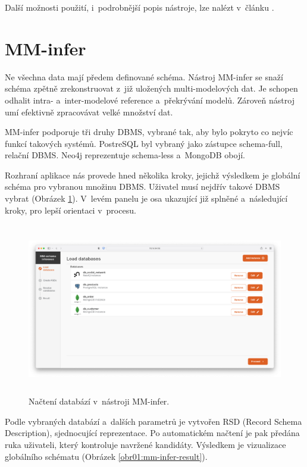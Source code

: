 Další možnosti použití, i~podrobnější popis nástroje, lze nalézt v~článku \cite{MM_cat}.


\section{MM-infer}

Ne všechna data mají předem definované schéma. Nástroj MM-infer se snaží schéma zpětně zrekonstruovat z~již uložených multi-modelových dat. Je schopen odhalit intra- a~inter-modelové reference a~překrývání modelů. Zároveň nástroj umí efektivně zpracovávat velké množství dat.

MM-infer podporuje tři druhy DBMS, vybrané tak, aby bylo pokryto co nejvíc funkcí takových systémů. PostreSQL byl vybraný jako zástupce schema-full, relační DBMS. Neo4j reprezentuje schema-less a~MongoDB obojí. 

Rozhraní aplikace nás provede hned několika kroky, jejichž výsledkem je globální schéma pro vybranou množinu DBMS. Uživatel musí nejdřív takové DBMS vybrat (Obrázek \ref{obr01:mm-infer-load-database}). V~levém panelu je osa ukazující již splněné a~následující kroky, pro lepší orientaci v~procesu.

\begin{figure}[htb]
  \centering
  \includegraphics[height=75mm]{../img/mm-infer-load-database}
  \caption{Načtení databází v~nástroji MM-infer.}
  \label{obr01:mm-infer-load-database}
\end{figure}

Podle vybraných databází a~dalších parametrů je vytvořen RSD (Record Schema Description), sjednocující reprezentace. Po automatickém načtení je pak předána ruka uživateli, který kontroluje navržené kandidáty. Výsledkem je vizualizace globálního schématu (Obrázek \ref{obr01:mm-infer-result}).

